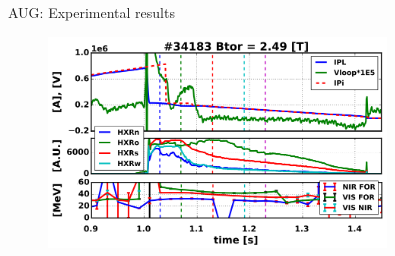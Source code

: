 \documentclass{beamer}
\begin{document}
\begin{frame}{AUG: Experimental results}
{	\begin{figure}
		\vspace*{-.1cm}
		\begin{center}
            \includegraphics[width=0.8\textwidth]{chapterreisfig/asdex/asdex_34183.png}
        \end{center}
	\end{figure}

}

\end{frame}
\end{document}
